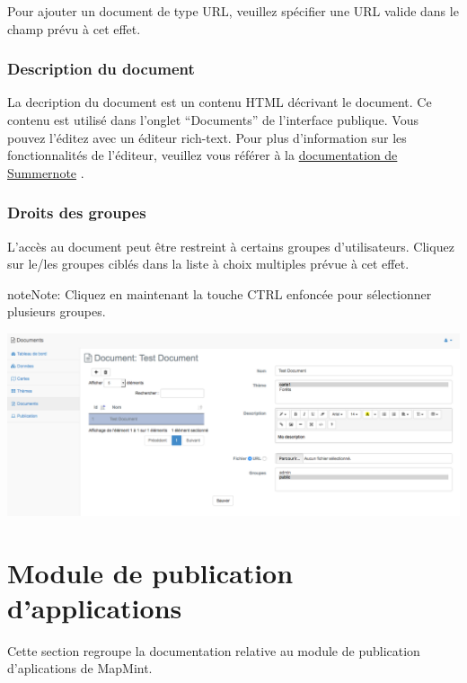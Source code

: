\documentclass[letterpaper,10pt,french]{sphinxmanual}
\begin{document}
Pour ajouter un document de type URL, veuillez spécifier une URL valide dans le champ prévu à cet effet.


\subsection{Description du document}
\label{documents/infopanel:description-du-document}
La decription du document est un contenu HTML décrivant le document. Ce contenu est utilisé dans l'onglet ``Documents'' de l'interface publique. Vous pouvez l'éditez avec un éditeur rich-text. Pour plus d'information sur les fonctionnalités de l'éditeur, veuillez vous référer à la \href{http://summernote.org//}{documentation de Summernote} .


\subsection{Droits des groupes}
\label{documents/infopanel:droits-des-groupes}
L'accès au document peut être restreint à certains groupes d'utilisateurs. Cliquez sur le/les groupes ciblés dans la liste à choix multiples prévue à cet effet.

\begin{notice}{note}{Note:}
Cliquez en maintenant la touche CTRL enfoncée pour sélectionner plusieurs groupes.
\end{notice}

\includegraphics[width=1.000\linewidth]{document-module-preview.png}


\chapter{Module de publication d'applications}
\label{apps/index:apps}\label{apps/index::doc}\label{apps/index:module-de-publication-d-applications}
Cette section regroupe la documentation relative au module de publication d'aplications de MapMint.
\end{document}
